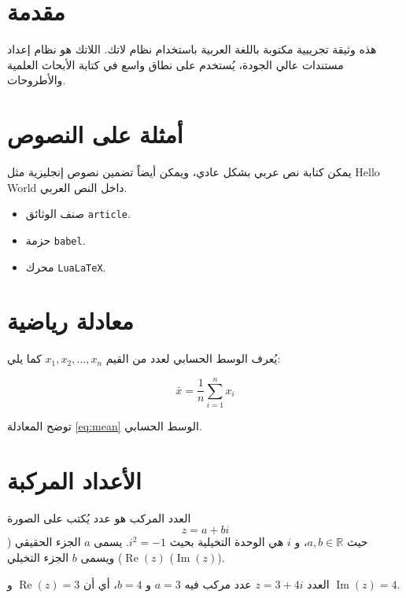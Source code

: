 \section{مقدمة}

هذه وثيقة تجريبية مكتوبة باللغة العربية باستخدام نظام لاتك. اللاتك هو نظام إعداد مستندات عالي الجودة، يُستخدم على نطاق واسع في كتابة الأبحاث العلمية والأطروحات.

\section{أمثلة على النصوص}

يمكن كتابة نص عربي بشكل عادي، ويمكن أيضاً تضمين نصوص إنجليزية مثل \foreignlanguage{english}{Hello World} داخل النص العربي.

\begin{itemize}
  \item صنف الوثائق \texttt{article}.
  \item حزمة \texttt{babel}.
  \item محرك \texttt{LuaLaTeX}.
\end{itemize}

\section{معادلة رياضية}

يُعرف الوسط الحسابي لعدد من القيم $x_1, x_2, \dots, x_n$ كما يلي:

\begin{equation}
  \bar{x} = \frac{1}{n} \sum_{i=1}^{n} x_i
  \label{eq:mean}
\end{equation}

توضح المعادلة \ref{eq:mean} الوسط الحسابي.

\section{الأعداد المركبة}

\begin{definition}
العدد المركب هو عدد يُكتب على الصورة
\begin{equation*}
  z = a + bi
\end{equation*}
حيث $a, b \in \mathbb{R}$، و $i$ هي الوحدة التخيلية بحيث $i^2 = -1$. يسمى $a$ الجزء الحقيقي ($\operatorname{Re}(z)$) ويسمى $b$ الجزء التخيلي ($\operatorname{Im}(z)$).
\end{definition}

\begin{example}
العدد $z = 3 + 4i$ عدد مركب فيه $a = 3$ و $b = 4$، أي أن $\operatorname{Re}(z) = 3$ و $\operatorname{Im}(z) = 4$.
\end{example}

